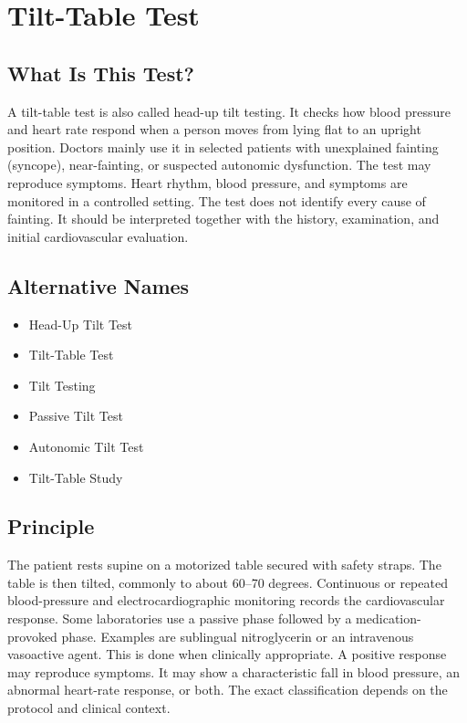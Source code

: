 \chapter{Tilt-Table Test}

\section*{What Is This Test?}
A tilt-table test is also called head-up tilt testing. It checks how blood pressure and heart rate respond when a person moves from lying flat to an upright position. Doctors mainly use it in selected patients with unexplained fainting (syncope), near-fainting, or suspected autonomic dysfunction. The test may reproduce symptoms. Heart rhythm, blood pressure, and symptoms are monitored in a controlled setting. The test does not identify every cause of fainting. It should be interpreted together with the history, examination, and initial cardiovascular evaluation.

\section*{Alternative Names}
\begin{itemize}
  \item Head-Up Tilt Test
  \item Tilt-Table Test
  \item Tilt Testing
  \item Passive Tilt Test
  \item Autonomic Tilt Test
  \item Tilt-Table Study
\end{itemize}
\section*{Principle}
The patient rests supine on a motorized table secured with safety straps. The table is then tilted, commonly to about 60--70 degrees. Continuous or repeated blood-pressure and electrocardiographic monitoring records the cardiovascular response. Some laboratories use a passive phase followed by a medication-provoked phase. Examples are sublingual nitroglycerin or an intravenous vasoactive agent. This is done when clinically appropriate. A positive response may reproduce symptoms. It may show a characteristic fall in blood pressure, an abnormal heart-rate response, or both. The exact classification depends on the protocol and clinical context.

